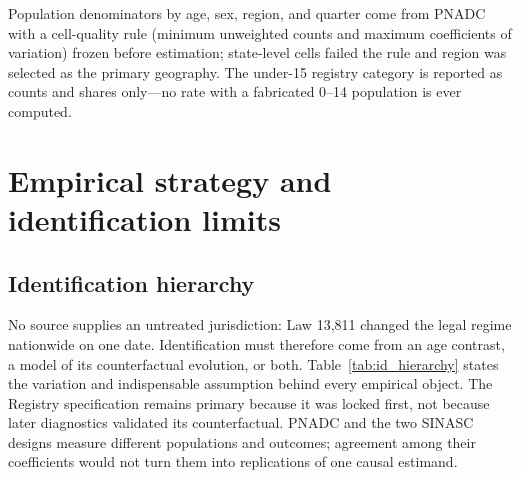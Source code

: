 \documentclass[12pt]{article}
\begin{document}
Population denominators by age, sex, region, and quarter come from PNADC with a
cell-quality rule (minimum unweighted counts and maximum coefficients of variation)
frozen before estimation; state-level cells failed the rule and region was selected as
the primary geography. The under-15 registry category is reported as counts and shares
only---no rate with a fabricated 0--14 population is ever computed.

\section{Empirical strategy and identification limits}\label{sec:strategy}

\subsection{Identification hierarchy}

No source supplies an untreated jurisdiction: Law 13,811 changed the legal regime
nationwide on one date. Identification must therefore come from an age contrast, a
model of its counterfactual evolution, or both. Table~\ref{tab:id_hierarchy} states the
variation and indispensable assumption behind every empirical object. The Registry
specification remains primary because it was locked first, not because later diagnostics
validated its counterfactual. PNADC and the two SINASC designs measure different
populations and outcomes; agreement among their coefficients would not turn them into
replications of one causal estimand.
\end{document}
